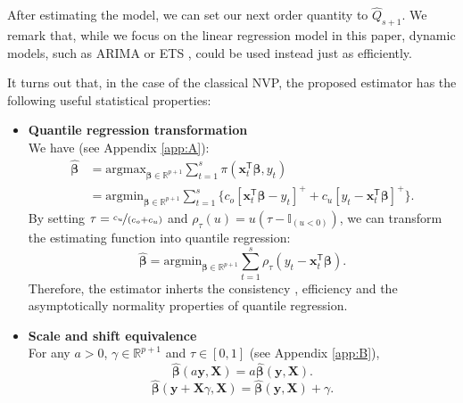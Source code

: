 \documentclass{article}
\begin{document}
After estimating the model, we can set our next order quantity to $\hat{Q}_{s+1}$. We remark that, while we focus on the linear regression model in this paper, dynamic models, such as ARIMA or ETS \cite{HKO08}, could be used instead just as efficiently. 

It turns out that, in the case of the classical NVP, the proposed estimator has the following useful statistical properties:
\begin{itemize}
    \item \textbf{Quantile regression transformation}\\
    We have (see Appendix \ref{app:A}):
    \[
        \begin{aligned}
            \hat{\boldsymbol{\beta}}
            &=\text{argmax}_{\boldsymbol{\beta}\in \mathbb{R}^{p+1}}\displaystyle\sum_{t=1}^s{\pi(\mathbf{x}_t^{\mathsf{T}}\boldsymbol{\beta},y_t)}\\
            &=\text{argmin}_{\boldsymbol{\beta}\in \mathbb{R}^{p+1}}\displaystyle\sum_{t=1}^s{\{c_o[\mathbf{x}_t^{\mathsf{T}}\boldsymbol{\beta}-y_t]^{+}+c_u[y_t-\mathbf{x}_t^{\mathsf{T}}\boldsymbol{\beta}]^{+}\}}.
        \end{aligned}
    \]
    By setting $\tau=\nicefrac{c_u}{(c_o+c_u)}$ and $\displaystyle \rho_{\tau}(u)=u(\tau-\mathbb{I}_{(u<0)})$, we can transform the estimating function into quantile regression:
    \[
         \hat{\boldsymbol{\beta}}=\text{argmin}_{\boldsymbol{\beta}\in \mathbb{R}^{p+1}}\displaystyle\sum_{t=1}^s\rho_{\tau}(y_t-\mathbf{x}_t^{\mathsf{T}}\boldsymbol{\beta}).
    \]
    Therefore, the estimator inherts the consistency \cite{Koe05}, efficiency \cite{KM99} and the asymptotically normality properties \cite{KHM05} of quantile regression.
    
    \item \textbf{Scale and shift equivalence}\\
    For any $a>0$, $\gamma\in \mathbb{R}^{p+1}$ and $\tau\in[0,1]$ (see Appendix \ref{app:B}),
    \[
        \hat{\boldsymbol{\beta}}(a\mathbf{y},\mathbf{X})=a\hat{\boldsymbol{\beta}}(\mathbf{y},\mathbf{X}).
    \]
    \[
        \hat{\boldsymbol{\beta}}(\mathbf{y}+\mathbf{X}\gamma,\mathbf{X})=\hat{\boldsymbol{\beta}}(\mathbf{y},\mathbf{X})+\gamma.
    \]
    

\end{itemize}
\end{document}
